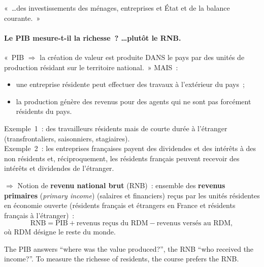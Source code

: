\begin{remark}
  «~\ldots des investissements des ménages, entreprises et État et de la balance
  courante.~»
\end{remark}

\paragraph{Le PIB mesure-t-il la richesse~? \ldots plutôt le RNB.} «~PIB
$\Rightarrow$ la création de valeur est produite DANS le pays par des unités de
production résidant sur le territoire national.~» MAIS~:
\begin{itemize}
  \item une entreprise résidente peut effectuer des travaux à l'extérieur du
    pays~;
  \item la production génère des revenus pour des agents qui ne sont pas
    forcément résidents du pays.
\end{itemize}

\begin{example}
  Exemple~1~: des travailleurs résidents mais de courte durée à l'étranger
  (transfrontaliers, saisonniers, stagiaires).\\
  Exemple~2~: les entreprises françaises payent des dividendes et des intérêts à
  des non résidents et, réciproquement, les résidents français peuvent recevoir
  des intérêts et dividendes de l'étranger.
\end{example}

\begin{definition}
  $\Rightarrow$ Notion de \textbf{revenu national brut} (RNB)~: ensemble des
  \textbf{revenus primaires} (\textit{primary income}) (salaires et financiers)
  reçus par les unités résidentes en économie ouverte (résidents français et
  étrangers en France et résidents français à l'étranger)~:
  \[
    \text{RNB} = \text{PIB} + \text{revenus reçus du RDM}
    - \text{revenus versés au RDM},
  \]
  où RDM désigne le reste du monde.
\end{definition}

The PIB answers ``where was the value produced?'', the RNB ``who received the
income?''. To measure the richesse of residents, the course prefers the RNB.

